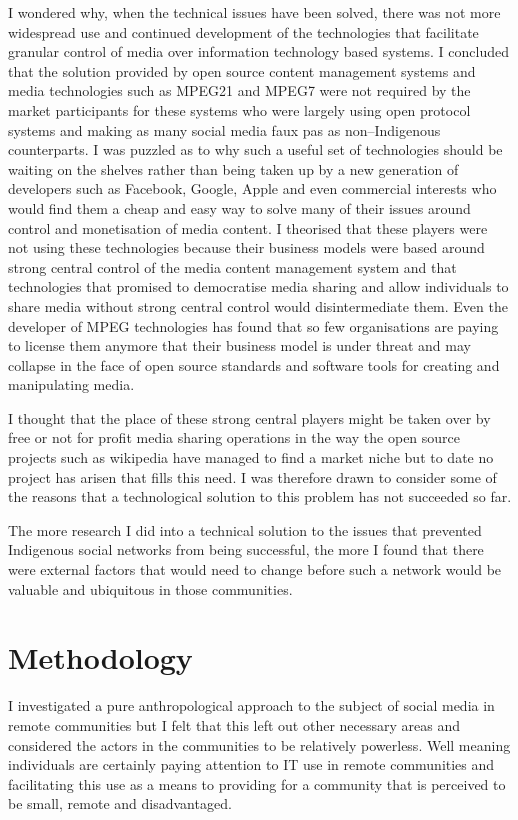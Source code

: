 I wondered why, when the technical issues have been solved, there was not more widespread use and continued development of the technologies that facilitate granular control of media over information technology based systems. I concluded that the solution provided by open source content management systems and media technologies such as MPEG21 and MPEG7 were not required by the market participants for these systems who were largely using open protocol systems and making as many social media faux pas as non--Indigenous counterparts. I was puzzled as to why such a useful set of technologies should be waiting on the shelves rather than being taken up by a new generation of developers such as Facebook, Google, Apple and even commercial interests who would find them a cheap and easy way to solve many of their issues around control and monetisation of media content. I theorised that these players were not using these technologies because their business models were based around strong central control of the media content management system and that technologies that promised to democratise media sharing and allow individuals to share media without strong central control would disintermediate them. Even the developer of MPEG technologies has found that so few organisations are paying to license them anymore that their business model is under threat and may collapse in the face of open source standards and software tools for creating and manipulating media\cite{RefWorks:423}.

I thought that the place of these strong central players might be taken over by free or not for profit media sharing operations in the way the open source projects such as wikipedia have managed to find a market niche but to date no project has arisen that fills this need. I was therefore drawn to consider some of the reasons that a technological solution to this problem has not succeeded so far.

The more research I did into a technical solution to the issues that prevented Indigenous social networks from being successful, the more I found that there were external factors that would need to change before such a network would be valuable and ubiquitous in those communities. 


\section{Methodology}
I investigated a pure anthropological approach to the subject of social media in remote communities but I felt that this left out other necessary areas and considered the actors in the communities to be relatively powerless. Well meaning individuals are certainly paying attention to IT use in remote communities and facilitating this use as a means to providing for a community that is perceived to be small, remote and disadvantaged. 

